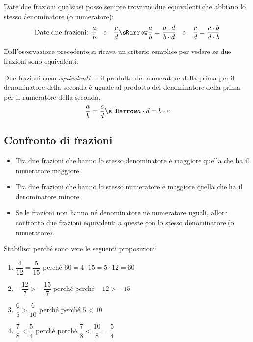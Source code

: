 \begin{osservazione}
 Date due frazioni qualsiasi posso sempre trovarne due equivalenti che 
abbiano lo stesso denominatore (o numeratore):
\[\text{Date due frazioni: } \frac{a}{b} \quad \text{e} \quad \frac{c}{d} 
\sRarrow
\frac{a}{b} = \frac{a \cdot d}{b \cdot d} \quad \text{e} \quad 
\frac{c}{d} = \frac{c \cdot b}{d \cdot b}\]
\end{osservazione}

Dall'osservazione precedente si ricava un criterio semplice 
per vedere se due frazioni sono equivalenti:

\begin{definizione}
 Due frazioni sono \emph{equivalenti} se il prodotto del numeratore della 
prima per il denominatore della seconda è uguale al prodotto del 
denominatore della prima per il numeratore della seconda.
\[\frac{a}{b} = \frac{c}{d} \sLRarrow a \cdot d = b \cdot c\]
\end{definizione}

\subsection{Confronto di frazioni}
\label{sub:razionali_confronto}

\begin{definizione}
\begin{itemize}
 \item Tra due frazioni che hanno lo stesso denominatore è maggiore quella 
che ha il numeratore maggiore.
 \item Tra due frazioni che hanno lo stesso numeratore è maggiore quella 
che ha il denominatore minore.
 \item Se le frazioni non hanno né denominatore né numeratore uguali, 
allora confronto due frazioni equivalenti a queste con lo stesso 
denominatore (o numeratore).
\end{itemize}
\end{definizione}

\begin{esempio}
 Stabilisci perché sono vere le seguenti proposizioni:
 \begin{enumerate} [noitemsep]
  \item \(\dfrac{4}{12} = \dfrac{5}{15}\)
    \qquad perché \quad \(60 = 4 \cdot 15 = 5 \cdot 12 = 60\)
  \item \(-\dfrac{12}{7} > -\dfrac{15}{7}\)
    \qquad perché \quad perché \(-12 > -15\)
  \item \(\dfrac{6}{5} > \dfrac{6}{10}\)
    \qquad perché \quad perché \(5 < 10\)
  \item \(\dfrac{7}{8} < \dfrac{5}{4}\)
    \qquad perché \quad perché \(\dfrac{7}{8} < \dfrac{10}{8} = 
\dfrac{5}{4}\)
 \end{enumerate}
\end{esempio}

